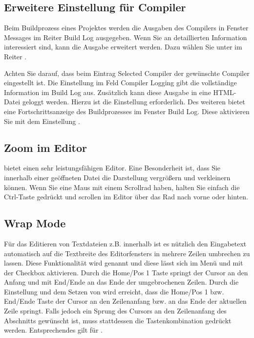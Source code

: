\subsection{Erweitere Einstellung für Compiler}

Beim Buildprozess eines Projektes werden die Ausgaben des Compilers in Fenster Messages im Reiter Build Log ausgegeben. Wenn Sie an detaillierten Information interessiert sind, kann die Ausgabe erweitert werden. Dazu wählen Sie unter  im Reiter .


Achten Sie darauf, dass beim Eintrag Selected Compiler der gewünschte Compiler eingestellt ist. Die Einstellung  im Feld Compiler Logging gibt die vollständige Information im Build Log aus. Zusätzlich kann diese Ausgabe in eine HTML-Datei geloggt werden. Hierzu ist die Einstellung  erforderlich.
Des weiteren bietet \codeblocks eine Fortschrittsanzeige des Buildprozesses im Fenster Build Log. Diese aktivieren Sie mit dem Einstellung .

\subsection{Zoom im Editor}

\codeblocks bietet einen sehr leistungsfähigen Editor. Eine Besonderheit ist, dass Sie innerhalb einer geöffneten Datei die Darstellung vergrößern und verkleinern können. Wenn Sie eine Maus mit einem Scrollrad haben, halten Sie einfach die Ctrl-Taste gedrückt und scrollen im Editor über das Rad nach vorne oder hinten.


\subsection{Wrap Mode}

Für das Editieren von Textdateien z.B.  innerhalb \codeblocks ist es nützlich den Eingabetext automatisch auf die Textbreite des Editorfensters in mehrere Zeilen umbrechen zu lassen. Diese Funktionalität wird  genannt und diese lässt sich im Menü  und mit der Checkbox  aktivieren. Durch die Home/Pos 1 Taste springt der Cursor an den Anfang und mit End/Ende an das Ende der umgebrochenen Zeilen. Durch die Einstellung  und dem Setzen von  wird erreicht, dass die Home/Pos 1 bzw. End/Ende Taste der Cursor an den Zeilenanfang bzw. an das Ende der aktuellen Zeile springt. Falls jedoch ein Sprung des Cursors an den Zeilenanfang des Abschnitts gewünscht ist, muss stattdessen die Tastenkombination  gedrückt werden. Entsprechendes gilt für .

